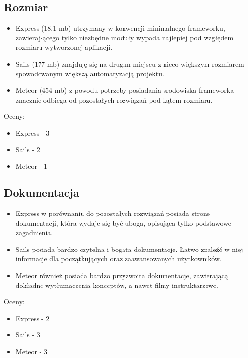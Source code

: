 \documentclass[12pt]{report}
\begin{document}
    \subsection{Rozmiar}
      \begin{itemize}
        \item Express (18.1 mb) utrzymany w konwencji minimalnego frameworku, zawieraj-ącego tylko niezbędne moduły wypada najlepiej pod wzgłędem rozmiaru wytworzonej aplikacji.
        \item Sails (177 mb) znajduję się na drugim miejscu z nieco większym rozmiarem spowodowanym większą automatyzacją projektu.
        \item Meteor (454 mb) z powodu potrzeby posiadania środowiska frameworka znacznie odbiega od pozostałych rozwiązań pod kątem rozmiaru.
      \end{itemize}
      Oceny:
      \begin{itemize}
        \item Express - 3
        \item Sails - 2
        \item Meteor - 1
      \end{itemize}
      
    \subsection{Dokumentacja}
      \begin{itemize}
        \item Express w porównaniu do pozostałych rozwiązań posiada strone dokumentacji, która wydaje się być uboga, opisująca tylko podstawowe zagadnienia.
        \item Sails posiada bardzo czytelna i bogata dokumentacje. Łatwo znaleźć w niej informacje dla początkujących oraz zaawansowanych użytkowników.
        \item Meteor również posiada bardzo przyzwoita dokumentacje, zawierającą dokładne wytłumaczenia konceptów, a nawet filmy instruktarzowe.
      \end{itemize}
      Oceny:
      \begin{itemize}
        \item Express - 2
        \item Sails - 3
        \item Meteor - 3
      \end{itemize}
      
\end{document}

